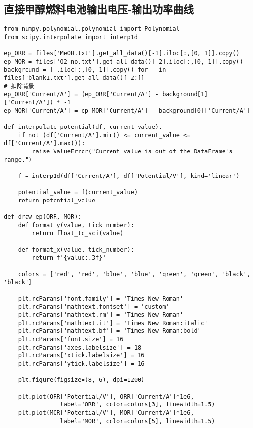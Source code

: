 \subsection{直接甲醇燃料电池输出电压-输出功率曲线}

\begin{verbatim}
from numpy.polynomial.polynomial import Polynomial
from scipy.interpolate import interp1d

ep_ORR = files['MeOH.txt'].get_all_data()[-1].iloc[:,[0, 1]].copy()
ep_MOR = files['O2-no.txt'].get_all_data()[-2].iloc[:,[0, 1]].copy()
background = [_.iloc[:,[0, 1]].copy() for _ in files['blank1.txt'].get_all_data()[-2:]]
# 扣除背景
ep_ORR['Current/A'] = (ep_ORR['Current/A'] - background[1]['Current/A']) * -1
ep_MOR['Current/A'] = ep_MOR['Current/A'] - background[0]['Current/A']

def interpolate_potential(df, current_value):
    if not (df['Current/A'].min() <= current_value <= df['Current/A'].max()):
        raise ValueError("Current value is out of the DataFrame's range.")

    f = interp1d(df['Current/A'], df['Potential/V'], kind='linear')

    potential_value = f(current_value)
    return potential_value

def draw_ep(ORR, MOR):
    def format_y(value, tick_number):
        return float_to_sci(value)

    def format_x(value, tick_number):
        return f'{value:.3f}'

    colors = ['red', 'red', 'blue', 'blue', 'green', 'green', 'black', 'black']

    plt.rcParams['font.family'] = 'Times New Roman'
    plt.rcParams['mathtext.fontset'] = 'custom'
    plt.rcParams['mathtext.rm'] = 'Times New Roman'
    plt.rcParams['mathtext.it'] = 'Times New Roman:italic'
    plt.rcParams['mathtext.bf'] = 'Times New Roman:bold'
    plt.rcParams['font.size'] = 16
    plt.rcParams['axes.labelsize'] = 18
    plt.rcParams['xtick.labelsize'] = 16
    plt.rcParams['ytick.labelsize'] = 16

    plt.figure(figsize=(8, 6), dpi=1200)

    plt.plot(ORR['Potential/V'], ORR['Current/A']*1e6, 
                label='ORR', color=colors[3], linewidth=1.5)
    plt.plot(MOR['Potential/V'], MOR['Current/A']*1e6,
                label='MOR', color=colors[5], linewidth=1.5)
    

\end{verbatim}
